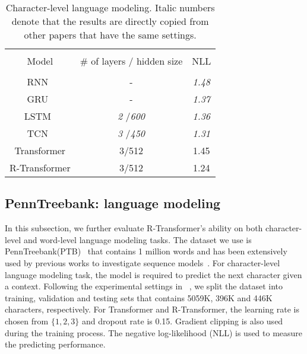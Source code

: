 \documentclass{article} \usepackage{iclr2019_conference,times}
\begin{document}
\begin{table}
\begin{center}	
		\caption{Character-level language modeling. Italic numbers denote that the results are directly copied from other papers that have the same settings.}
		\vspace{4mm}
		\label{table:ptb_c}
\begin{tabular}{ccc}
			\hline \\[-0.9ex]
			Model &  \# of layers / hidden size & NLL\\ [0.9ex]	
			\hline			\\[-0.9ex]
			RNN~\citep{bai2018empirical} &  -   &  {\it 1.48} \\ 	[0.5ex]		
			GRU~\citep{bai2018empirical} & - &  {\it 1.37}  \\	[0.5ex]		
			LSTM~\citep{bai2018empirical} &  {\it 2} /{\it 600} & {\it 1.36} \\[0.5ex]
			TCN~\citep{bai2018empirical} &  {\it 3} /{\it 450} &  {\it 1.31} \\[0.5ex]
			Transformer &  3/512  & 1.45\\[0.5ex]
			R-Transformer & 3/512  & 1.24 \\[0.6ex]
			\hline   
		\end{tabular}
	\end{center}
\end{table}

\subsection{PennTreebank: language modeling}
In this subsection, we further evaluate R-Transformer's ability on both character-level and word-level language modeling tasks. The dataset we use is PennTreebank(PTB)~\citep{marcus1993building} that contains 1 million words and has been extensively used by previous works to investigate sequence models~\citep{chen1999empirical, chelba2000structured,kim2016character,tran2016recurrent}. For character-level language modeling task, the model is required to predict the next character given a context. Following the experimental settings in ~\citet{bai2018empirical}, we split the dataset into training, validation and testing sets that contains 5059K, 396K and 446K characters, respectively. For Transformer and R-Transformer, the learning rate is chosen from $\{1, 2, 3\}$ and dropout rate is 0.15.  Gradient clipping is also used during the training process. The negative log-likelihood (NLL) is used to measure the predicting performance. 
\end{document}

